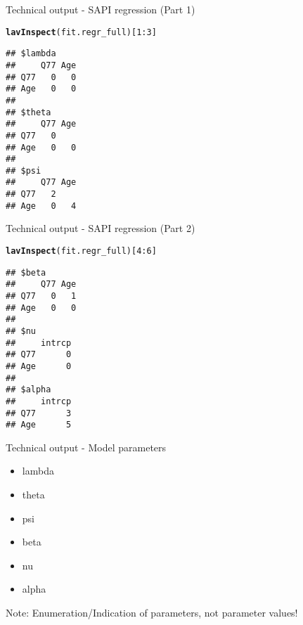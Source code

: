 \documentclass[10pt]{beamer}\usepackage[]{graphicx}\usepackage[]{xcolor}
\makeatletter
\newcommand{\hlnum}[1]{\textcolor[rgb]{0.686,0.059,0.569}{#1}}%
\newcommand{\hlopt}[1]{\textcolor[rgb]{0,0,0}{#1}}%
\newcommand{\hldef}[1]{\textcolor[rgb]{0.345,0.345,0.345}{#1}}%
\newcommand{\hlkwd}[1]{\textcolor[rgb]{0.737,0.353,0.396}{\textbf{#1}}}%
\newenvironment{kframe}{%
 \def\at@end@of@kframe{}%
 \ifinner\ifhmode%
  \def\at@end@of@kframe{\end{minipage}}%
  \begin{minipage}{\columnwidth}%
 \fi\fi%
 \def\FrameCommand##1{\hskip\@totalleftmargin \hskip-\fboxsep
 \colorbox{shadecolor}{##1}\hskip-\fboxsep
     \hskip-\linewidth \hskip-\@totalleftmargin \hskip\columnwidth}%
 \MakeFramed {\advance\hsize-\width
   \@totalleftmargin\z@ \linewidth\hsize
   \@setminipage}}%
 {\par\unskip\endMakeFramed%
 \at@end@of@kframe}
\newenvironment{knitrout}{}{} %
\makeatother
\begin{document}
\begin{frame}[fragile]{Technical output - SAPI regression (Part 1)}
\begin{knitrout}
\color{fgcolor}\begin{kframe}
\begin{alltt}
\hlkwd{lavInspect}\hldef{(fit.regr_full)[}\hlnum{1}\hlopt{:}\hlnum{3}\hldef{]}
\end{alltt}
\begin{verbatim}
## $lambda
##     Q77 Age
## Q77   0   0
## Age   0   0
## 
## $theta
##     Q77 Age
## Q77   0    
## Age   0   0
## 
## $psi
##     Q77 Age
## Q77   2    
## Age   0   4
\end{verbatim}
\end{kframe}
\end{knitrout}
\end{frame}
%
\begin{frame}[fragile]{Technical output - SAPI regression (Part 2)}
\begin{knitrout}
\color{fgcolor}\begin{kframe}
\begin{alltt}
\hlkwd{lavInspect}\hldef{(fit.regr_full)[}\hlnum{4}\hlopt{:}\hlnum{6}\hldef{]}
\end{alltt}
\begin{verbatim}
## $beta
##     Q77 Age
## Q77   0   1
## Age   0   0
## 
## $nu
##     intrcp
## Q77      0
## Age      0
## 
## $alpha
##     intrcp
## Q77      3
## Age      5
\end{verbatim}
\end{kframe}
\end{knitrout}
\end{frame}
%
\begin{frame}[fragile]{Technical output - Model parameters}

\begin{itemize}
\item lambda
\item theta
\item psi
\item beta
\item nu
\item alpha
\end{itemize}

\vspace{5mm}

Note: Enumeration/Indication of parameters, not parameter values!

\end{frame}
%
\end{document}
